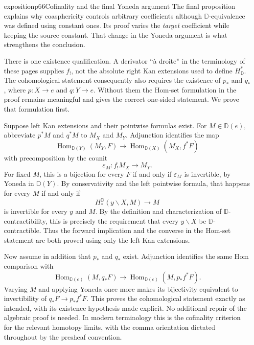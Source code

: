 \begin{dcomment}{exposition}{p66}{Cofinality and the final Yoneda argument}
The final proposition explains why coasphericity controls arbitrary coefficients although $\mathbb D$-equivalence was defined using constant ones. Its proof varies the \emph{target} coefficient while keeping the source constant. That change in the Yoneda argument is what strengthens the conclusion.

There is one existence qualification. A derivator ``\`a droite'' in the terminology of these pages supplies $f_!$, not the absolute right Kan extensions used to define $H^*_{\mathbb D}$. The cohomological statement consequently also requires the existence of $p_*$ and $q_*$, where $p:X\to e$ and $q:Y\to e$. Without them the Hom-set formulation in the proof remains meaningful and gives the correct one-sided statement. We prove that formulation first.

Suppose left Kan extensions and their pointwise formulas exist. For $M\in\mathbb D(e)$, abbreviate $p^*M$ and $q^*M$ to $M_X$ and $M_Y$. Adjunction identifies the map
\[
 \operatorname{Hom}_{\mathbb D(Y)}(M_Y,F)
 \longrightarrow
 \operatorname{Hom}_{\mathbb D(X)}(M_X,f^*F)
\]
with precomposition by the counit
\[
 \varepsilon_M:f_!M_X\longrightarrow M_Y.
\]
For fixed $M$, this is a bijection for every $F$ if and only if $\varepsilon_M$ is invertible, by Yoneda in $\mathbb D(Y)$. By conservativity and the left pointwise formula, that happens for every $M$ if and only if
\[
 H_*^{\mathbb D}(y\backslash X,M)\longrightarrow M
\]
is invertible for every $y$ and $M$. By the definition and characterization of $\mathbb D$-contractibility, this is precisely the requirement that every $y\backslash X$ be $\mathbb D$-contractible. Thus the forward implication and the converse in the Hom-set statement are both proved using only the left Kan extensions.

Now assume in addition that $p_*$ and $q_*$ exist. Adjunction identifies the same Hom comparison with
\[
 \operatorname{Hom}_{\mathbb D(e)}(M,q_*F)
 \longrightarrow
 \operatorname{Hom}_{\mathbb D(e)}(M,p_*f^*F).
\]
Varying $M$ and applying Yoneda once more makes its bijectivity equivalent to invertibility of $q_*F\to p_*f^*F$. This proves the cohomological statement exactly as intended, with its existence hypothesis made explicit. No additional repair of the algebraic proof is needed. In modern terminology this is the cofinality criterion for the relevant homotopy limits, with the comma orientation dictated throughout by the presheaf convention.
\end{dcomment}
